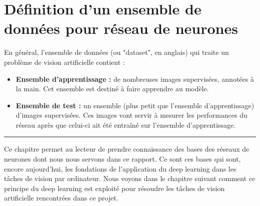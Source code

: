 \section{Définition d'un ensemble de données pour réseau de neurones}
En général, l'ensemble de données (ou "dataset", en anglais) qui traite un problème de vision artificielle contient :
\begin{itemize}
    \item \textbf{Ensemble d'apprentissage :} de nombreuses images supervisées, annotées à la main. Cet ensemble est destiné à faire apprendre au modèle.
    
    \item \textbf{Ensemble de test :} un ensemble (plus petit que l'ensemble d'apprentissage) d'images supervisées. Ces images vont servir à mesurer les performances du réseau après que celui-ci ait été entraîné sur l'ensemble d'apprentissage.
\end{itemize}

\hspace{1pt}
\par\noindent\rule{\textwidth}{0.4pt}
 
Ce chapitre permet au lecteur de prendre connaissance des bases des réseaux de neurones dont nous nous servons dans ce rapport. Ce sont ces bases qui sont, encore aujourd'hui, les fondations de l'application du deep learning dans les tâches de vision par ordinateur. Nous voyons dans le chapitre suivant comment ce principe du deep learning est exploité pour résoudre les tâches de vision artificielle rencontrées dans ce projet.
